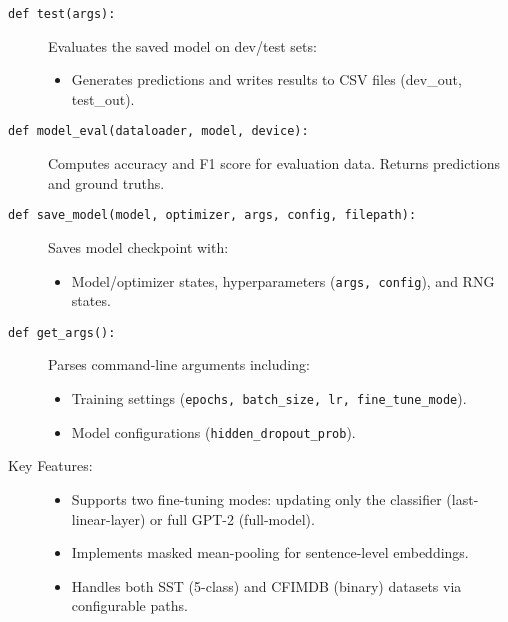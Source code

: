 \begin{description}
\item[\texttt{def test(args):}]
Evaluates the saved model on dev/test sets:
\begin{itemize}
\item Generates predictions and writes results to CSV files (dev\_out, test\_out).
\end{itemize}

\item[\texttt{def model\_eval(dataloader, model, device):}]
Computes accuracy and F1 score for evaluation data. Returns predictions and ground truths.

\item[\texttt{def save\_model(model, optimizer, args, config, filepath):}]
Saves model checkpoint with:
\begin{itemize}
\item Model/optimizer states, hyperparameters (\texttt{args, config}), and RNG states.
\end{itemize}

\item[\texttt{def get\_args():}]
Parses command-line arguments including:
\begin{itemize}
\item Training settings (\texttt{epochs, batch\_size, lr, fine\_tune\_mode}).
\item Model configurations (\texttt{hidden\_dropout\_prob}).
\end{itemize}

\item[Key Features:]

\begin{itemize}
\item Supports two fine-tuning modes: updating only the classifier (last-linear-layer) or full GPT-2 (full-model).
\item Implements masked mean-pooling for sentence-level embeddings.
\item Handles both SST (5-class) and CFIMDB (binary) datasets via configurable paths.
\end{itemize}
\end{description}

